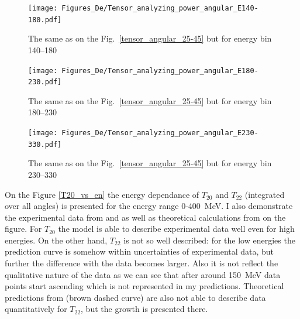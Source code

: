         

    \begin{figure}[h]
        \begin{center}
        \texttt{[image: Figures\_De/Tensor\_analyzing\_power\_angular\_E140-180.pdf]}
        \end{center}
        \caption{The same as on the Fig.~\ref*{tensor_angular_25-45} but for energy bin \SIrange{140}{180}{\mev}}
        \label{tensor_angular_140-180}
    \end{figure}
        

    \begin{figure}[h]
        \begin{center}
        \texttt{[image: Figures\_De/Tensor\_analyzing\_power\_angular\_E180-230.pdf]}
        \end{center}
        \caption{The same as on the Fig.~\ref*{tensor_angular_25-45} but for energy bin \SIrange{180}{230}{\mev}}
        \label{tensor_angular_180-230}
    \end{figure}

    \begin{figure}[h]
        \begin{center}
        \texttt{[image: Figures\_De/Tensor\_analyzing\_power\_angular\_E230-330.pdf]}
        \end{center}
        \caption{The same as on the Fig.~\ref*{tensor_angular_25-45} but for energy bin \SIrange{230}{330}{\mev}}
        \label{tensor_angular_230-330}
    \end{figure}
        


    On the Figure \ref{T20_vs_en} the energy dependance of $T_{20}$ and $T_{22}$
    (integrated over all angles)
    is presented for the energy range 0-400~MeV. I also demonstrate the experimental data from
    \cite{rachek2007} and \cite{mishev1993} as well as theoretical calculations from \cite{Schmitt1989}
    on the figure. For $T_{20}$ the model is able to describe experimental data well even for
    high energies. On the other hand, $T_{22}$ is not so well described: for the low 
    energies the prediction curve is somehow within uncertainties of experimental data,
    but further the difference with the data becomes larger. Also it is not 
    reflect the qualitative nature of the data as we can see that after around 150~MeV
    data points start ascending which is not represented in my predictions.
    Theoretical predictions from \cite{Schmitt1989} (brown dashed curve) are also not able
    to describe data quantitatively for $T_{22}$, but the growth is presented there. 


